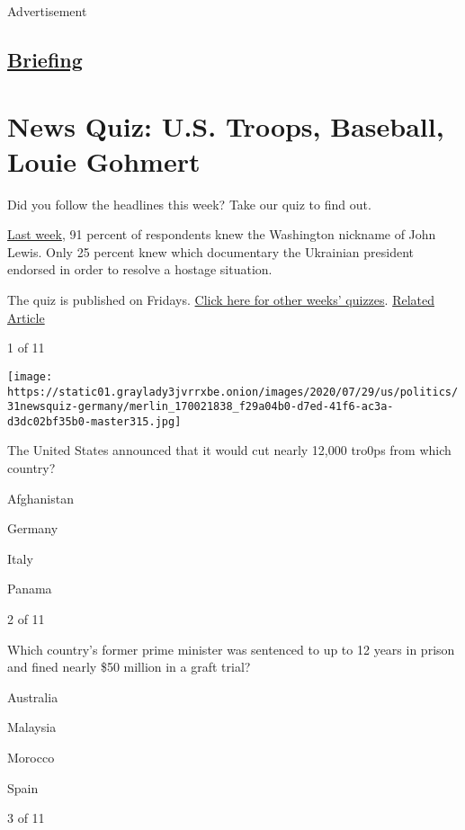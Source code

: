 Advertisement

\hypertarget{-briefing-}{%
\subsection{\texorpdfstring{
\href{/interactive/2018/briefing/global-morning-briefing-newsletter-signup.html}{Briefing}
}{ Briefing }}\label{-briefing-}}

\hypertarget{news-quiz-us-troops-baseball-louie-gohmert}{%
\section{News Quiz: U.S. Troops, Baseball, Louie
Gohmert}\label{news-quiz-us-troops-baseball-louie-gohmert}}

Did you follow the headlines this week? Take our quiz to find out.

\href{https://www.nytimes3xbfgragh.onion/interactive/2020/07/24/briefing/federal-agents-john-lewis-mars-news-quiz.html}{Last
week}, 91 percent of respondents knew the Washington nickname of John
Lewis. Only 25 percent knew which documentary the Ukrainian president
endorsed in order to resolve a hostage situation.

The quiz is published on Fridays.
\href{https://www.nytimes3xbfgragh.onion/spotlight/news-quiz}{Click here
for other weeks' quizzes}.
\href{https://www.nytimes3xbfgragh.onion/interactive/2020/07/24/briefing/federal-agents-john-lewis-mars-news-quiz.html}{Related
Article}

1 of 11

\texttt{[image: https://static01.graylady3jvrrxbe.onion/images/2020/07/29/us/politics/31newsquiz-germany/merlin\_170021838\_f29a04b0-d7ed-41f6-ac3a-d3dc02bf35b0-master315.jpg]}

The United States announced that it would cut nearly 12,000 tro0ps from
which country?

Afghanistan

Germany

Italy

Panama

2 of 11

Which country's former prime minister was sentenced to up to 12 years in
prison and fined nearly \$50 million in a graft trial?

Australia

Malaysia

Morocco

Spain

3 of 11

